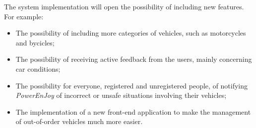 The system implementation will open the possibility of including new features. For example:

\begin{itemize}
\item The possibility of including more categories of vehicles, such as motorcycles and bycicles;
\item The possibility of receiving active feedback from the users, mainly concerning car conditions;
\item The possibility for everyone, registered and unregistered people, of notifying \emph{PowerEnJoy} of incorrect or unsafe situations involving their vehicles;
\item The implementation of a new front-end application to make the management of out-of-order vehicles much more easier.
\end{itemize}